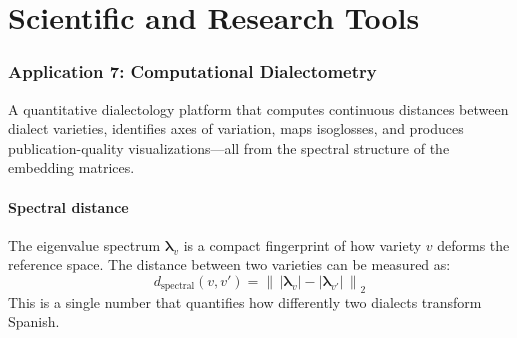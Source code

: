 \documentclass[11pt,a4paper]{article}
\begin{document}
\part{Scientific and Research Tools}

\section{Application 7: Computational Dialectometry}
\label{sec:app-dialectometry}

\begin{appbox}
A quantitative dialectology platform that computes continuous
distances between dialect varieties, identifies axes of variation,
maps isoglosses, and produces publication-quality visualizations---all
from the spectral structure of the embedding matrices.
\end{appbox}

\subsection{Spectral distance}

The eigenvalue spectrum $\boldsymbol{\lambda}_v$ is a compact
fingerprint of how variety $v$ deforms the reference space. The
distance between two varieties can be measured as:
\[
d_{\text{spectral}}(v, v')
= \left\|\,|\boldsymbol{\lambda}_v| - |\boldsymbol{\lambda}_{v'}|\,\right\|_2
\]
This is a single number that quantifies how differently two dialects
transform Spanish.
\end{document}
